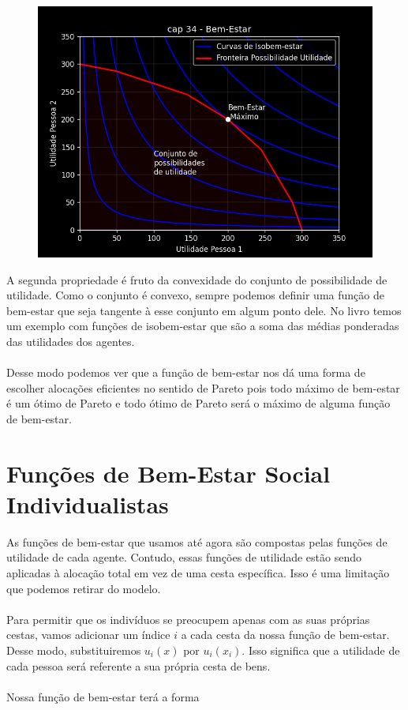 \documentclass[a4paper,11pt,oneside]{book}
\theoremstyle{definition}
\theoremstyle{break}
\begin{document}
\begin{figure}[H]
	\centering
	\includegraphics[scale=0.55]{cap34_3-maximizacao_bem_estar.png}
\end{figure}

A segunda propriedade é fruto da convexidade do conjunto de possibilidade de utilidade. Como o conjunto é convexo, sempre podemos definir uma função de bem-estar que seja tangente à esse conjunto em algum ponto dele. No livro temos um exemplo com funções de isobem-estar que são a soma das médias ponderadas das utilidades dos agentes.
\\~\\
Desse modo podemos ver que a função de bem-estar nos dá uma forma de escolher alocações eficientes no sentido de Pareto pois todo máximo de bem-estar é um ótimo de Pareto e todo ótimo de Pareto será o máximo de alguma função de bem-estar.

\section{Funções de Bem-Estar Social Individualistas}

As funções de bem-estar que usamos até agora são compostas pelas funções de utilidade de cada agente. Contudo, essas funções de utilidade estão sendo aplicadas à alocação total em vez de uma cesta específica. Isso é uma limitação que podemos retirar do modelo.
\\~\\
Para permitir que os indivíduos se preocupem apenas com as suas próprias cestas, vamos adicionar um índice $i$ a cada cesta da nossa função de bem-estar. Desse modo, substituiremos $u_i(x)$ por $u_i(x_i)$. Isso significa que a utilidade de cada pessoa será referente a sua própria cesta de bens.
\\~\\
Nossa função de bem-estar terá a forma
\end{document}
